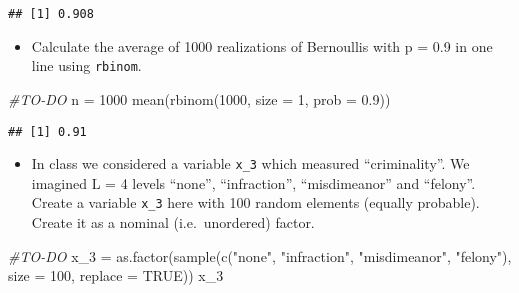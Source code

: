 \documentclass[
]{article}
\newenvironment{Shaded}{\begin{snugshade}}{\end{snugshade}}
\newcommand{\AttributeTok}[1]{\textcolor[rgb]{0.77,0.63,0.00}{#1}}
\newcommand{\CommentTok}[1]{\textcolor[rgb]{0.56,0.35,0.01}{\textit{#1}}}
\newcommand{\ConstantTok}[1]{\textcolor[rgb]{0.00,0.00,0.00}{#1}}
\newcommand{\DecValTok}[1]{\textcolor[rgb]{0.00,0.00,0.81}{#1}}
\newcommand{\FloatTok}[1]{\textcolor[rgb]{0.00,0.00,0.81}{#1}}
\newcommand{\FunctionTok}[1]{\textcolor[rgb]{0.00,0.00,0.00}{#1}}
\newcommand{\NormalTok}[1]{#1}
\newcommand{\OtherTok}[1]{\textcolor[rgb]{0.56,0.35,0.01}{#1}}
\newcommand{\StringTok}[1]{\textcolor[rgb]{0.31,0.60,0.02}{#1}}
\providecommand{\tightlist}{%
  \setlength{\itemsep}{0pt}\setlength{\parskip}{0pt}}
\begin{document}
\begin{verbatim}
## [1] 0.908
\end{verbatim}

\begin{itemize}
\tightlist
\item
  Calculate the average of 1000 realizations of Bernoullis with p = 0.9
  in one line using \texttt{rbinom}.
\end{itemize}

\begin{Shaded}
\begin{Highlighting}[]
\CommentTok{\#TO{-}DO}
\NormalTok{n }\OtherTok{=} \DecValTok{1000}
\FunctionTok{mean}\NormalTok{(}\FunctionTok{rbinom}\NormalTok{(}\DecValTok{1000}\NormalTok{, }\AttributeTok{size =} \DecValTok{1}\NormalTok{, }\AttributeTok{prob =} \FloatTok{0.9}\NormalTok{))}
\end{Highlighting}
\end{Shaded}

\begin{verbatim}
## [1] 0.91
\end{verbatim}

\begin{itemize}
\tightlist
\item
  In class we considered a variable \texttt{x\_3} which measured
  ``criminality''. We imagined L = 4 levels ``none'', ``infraction'',
  ``misdimeanor'' and ``felony''. Create a variable \texttt{x\_3} here
  with 100 random elements (equally probable). Create it as a nominal
  (i.e.~unordered) factor.
\end{itemize}

\begin{Shaded}
\begin{Highlighting}[]
\CommentTok{\#TO{-}DO}
\NormalTok{x\_3 }\OtherTok{=} \FunctionTok{as.factor}\NormalTok{(}\FunctionTok{sample}\NormalTok{(}\FunctionTok{c}\NormalTok{(}\StringTok{"none"}\NormalTok{, }\StringTok{"infraction"}\NormalTok{, }\StringTok{"misdimeanor"}\NormalTok{, }\StringTok{"felony"}\NormalTok{), }\AttributeTok{size =} \DecValTok{100}\NormalTok{, }\AttributeTok{replace =} \ConstantTok{TRUE}\NormalTok{))}
\NormalTok{x\_3}
\end{Highlighting}
\end{Shaded}
\end{document}
